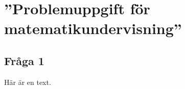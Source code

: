 \chapter{''Problemuppgift för matematikundervisning''}

\setcounter{section}{0}
\section{Fråga 1}
Här är en text.